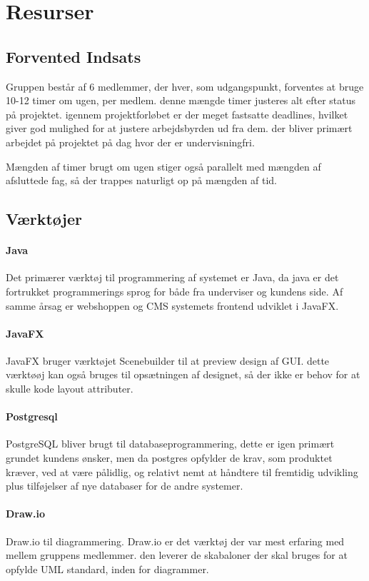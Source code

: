 \section{Resurser}

\subsection{Forvented Indsats}
Gruppen består af 6 medlemmer, der hver, som udgangspunkt, forventes at bruge 10-12 timer om ugen, per medlem. denne mængde timer justeres alt efter status på projektet. igennem projektforløbet er der meget fastsatte deadlines, hvilket giver god mulighed for at justere arbejdsbyrden ud fra dem. der bliver primært arbejdet på projektet på dag hvor der er undervisningfri.

Mængden af timer brugt om ugen stiger også parallelt med mængden af afsluttede fag, så der trappes naturligt op på mængden af tid.


\subsection{Værktøjer}
\paragraph{Java}
Det primærer værktøj til programmering af systemet er Java, da java er det fortrukket programmerings sprog for både fra underviser og kundens side. Af samme årsag er webshoppen og CMS systemets frontend udviklet i JavaFX.

\paragraph{JavaFX}
JavaFX bruger værktøjet Scenebuilder til at preview design af GUI. dette værktøøj kan også bruges til opsætningen af designet, så der ikke er behov for at skulle kode layout attributer. 

\paragraph{Postgresql}
PostgreSQL bliver brugt til databaseprogrammering, dette er igen primært grundet kundens ønsker, men da postgres opfylder de krav, som produktet kræver, ved at være pålidlig, og relativt nemt at håndtere til fremtidig udvikling plus tilføjelser af nye databaser for de andre systemer.

\paragraph{Draw.io}
Draw.io til diagrammering. Draw.io er det værktøj der var mest erfaring med mellem gruppens medlemmer. den leverer de skabaloner der skal bruges for at opfylde UML standard, inden for diagrammer.

